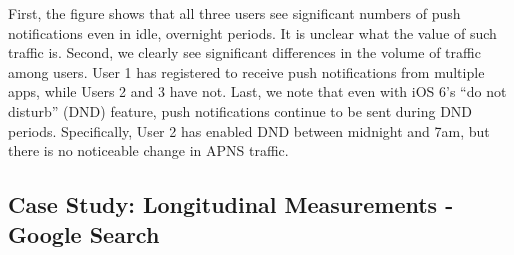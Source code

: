 First, the figure shows that all three users see significant numbers of push 
notifications even in idle, overnight periods. It is unclear what the value of 
such traffic is. Second, we clearly see significant differences in the volume 
of traffic among users. User 1 has registered to receive push notifications 
from multiple apps, while Users 2 and 3 have not. Last, we note that even 
with iOS 6's ``do not disturb'' (DND) feature, push notifications continue to be 
sent during DND periods. Specifically, User 2 has enabled DND between 
midnight and 7am, but there is no noticeable change in APNS traffic.

\subsection{Case Study: Longitudinal Measurements - Google Search }
\label{sec:case-study-google}




